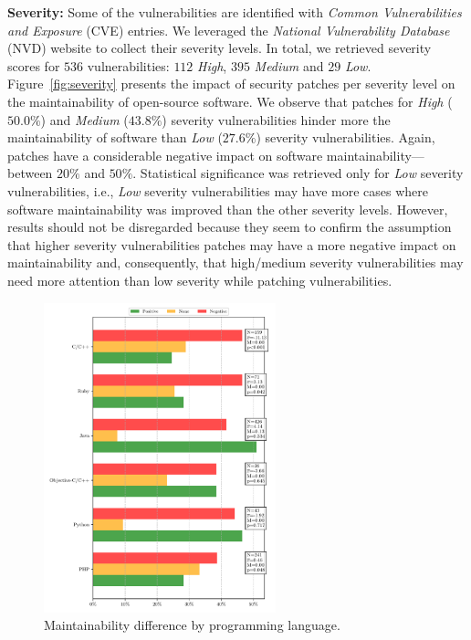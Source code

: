 \documentclass[smallextended]{svjour3}       %
\begin{document}
\textbf{Severity:} Some of the vulnerabilities are identified with 
\emph{Common Vulnerabilities and Exposure} (CVE) entries. We 
leveraged the \emph{National Vulnerability Database} (NVD) website 
to collect their severity levels. In total, we retrieved severity 
scores for $536$ vulnerabilities: $112$ \emph{High}, $395$ 
\emph{Medium} and $29$ \emph{Low}. Figure~\ref{fig:severity} 
presents the impact of security patches per severity level on the 
maintainability of open-source software. We observe that patches for 
\emph{High} ($50.0\%$) and \emph{Medium} ($43.8\%$) severity 
vulnerabilities hinder more the maintainability of software than 
\emph{Low} ($27.6\%$) severity vulnerabilities. Again, patches have 
a considerable negative impact on software maintainability---between 
$20\%$ and $50\%$. Statistical significance was retrieved only for 
\emph{Low} severity vulnerabilities, i.e., \emph{Low} severity 
vulnerabilities may have more cases where software maintainability was improved than the 
other severity levels. However, results should not be disregarded 
because they seem to confirm the 
assumption that higher severity vulnerabilities patches may have a 
more negative impact on maintainability and, consequently, that high/medium 
severity vulnerabilities may need more attention than low severity while 
patching vulnerabilities.


\begin{figure}[htp]
  \centering
  \includegraphics[width=0.6\textwidth]{figures/main_per_language.pdf}
  \caption{Maintainability difference by programming language.}
  \label{fig:lang_main}    
\end{figure}
\end{document}
